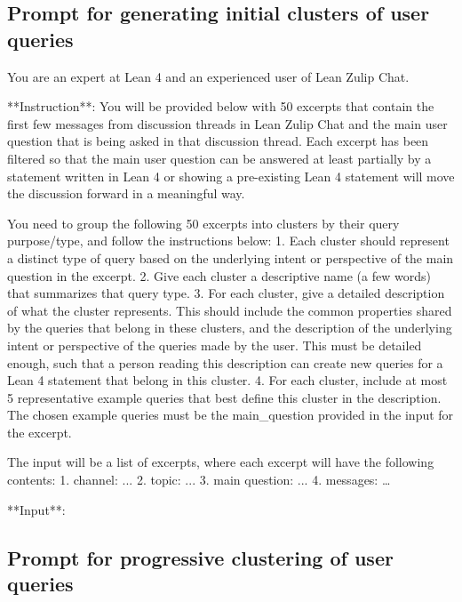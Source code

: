 \documentclass{article} %
\begin{document}
\subsection{Prompt for generating initial clusters of user queries}
\label{sec:bootstrap_prompt}

\begin{promptbox}
You are an expert at Lean 4 and an experienced user of Lean Zulip Chat.

**Instruction**:
You will be provided below with 50 excerpts that contain the first few messages from discussion threads in Lean Zulip Chat and the main user question that is being asked in that discussion thread. Each excerpt has been filtered so that the main user question can be answered at least partially by a statement written in Lean 4 or showing a pre-existing Lean 4 statement will move the discussion forward in a meaningful way. 

You need to group the following 50 excerpts into clusters by their query purpose/type, and follow the instructions below:
1. Each cluster should represent a distinct type of query based on the underlying intent or perspective of the main question in the excerpt.
2. Give each cluster a descriptive name (a few words) that summarizes that query type.
3. For each cluster, give a detailed description of what the cluster represents. This should include the common properties shared by the queries that belong in these clusters, and the description of the underlying intent or perspective of the queries made by the user. This must be detailed enough, such that a person reading this description can create new queries for a Lean 4 statement that belong in this cluster.
4. For each cluster, include at most 5 representative example queries that best define this cluster in the description. The chosen example queries must be the main_question provided in the input for the excerpt.

The input will be a list of excerpts, where each excerpt will have the following contents:
1. channel: ...
2. topic: ...
3. main question: ...
4. messages: …

**Input**:
\end{promptbox}


\subsection{Prompt for progressive clustering of user queries}
\label{sec:progressive_clustering}
\end{document}
